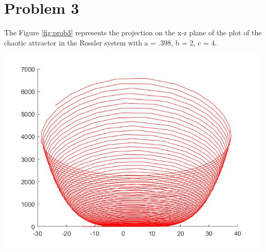 \documentclass{article}
\begin{document}
\section*{Problem 3}
The Figure \ref{fig:prob3} represents the projection on the x-z plane of the plot of the chaotic attractor in the Rossler system with a = .398, b = 2, c = 4.\par\medskip
\begin{minipage}{\linewidth}
{
\centering 
\includegraphics[scale=0.4]{images/prob3.jpg}
\label{fig:prob3}
}
\end{minipage}
\end{document}
